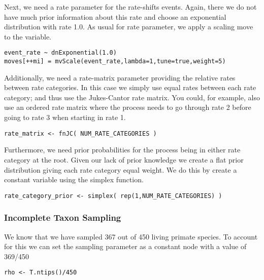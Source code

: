 Next, we need a rate parameter for the rate-shifts events.
Again, there we do not have much prior information about this rate and choose an exponential distribution with rate 1.0.
As usual for rate parameter, we apply a scaling move to the  variable.
{\tt \begin{snugshade*}
\begin{lstlisting}
event_rate ~ dnExponential(1.0)
moves[++mi] = mvScale(event_rate,lambda=1,tune=true,weight=5)
\end{lstlisting}
\end{snugshade*}}

Additionally, we need a rate-matrix parameter providing the relative rates between rate categories.
In this case we simply use equal rates between each rate category; and thus use the Jukes-Cantor rate matrix.
You could, for example, also use an ordered rate matrix where the process needs to go through rate 2 before going to rate 3 when starting in rate 1.
{\tt \begin{snugshade*}
\begin{lstlisting}
rate_matrix <- fnJC( NUM_RATE_CATEGORIES )
\end{lstlisting}
\end{snugshade*}}
Furthermore, we need prior probabilities for the process being in either rate category at the root.
Given our lack of prior knowledge we create a flat prior distribution giving each rate category equal weight.
We do this by create a constant variable using the simplex function.
{\tt \begin{snugshade*}
\begin{lstlisting}
rate_category_prior <- simplex( rep(1,NUM_RATE_CATEGORIES) )
\end{lstlisting}
\end{snugshade*}}



\subsubsection{Incomplete Taxon Sampling}

We know that we have sampled 367 out of 450 living primate species. 
To account for this we can set the sampling parameter as a constant node with a value of 369/450
{\tt \begin{snugshade*}
\begin{lstlisting}
rho <- T.ntips()/450
\end{lstlisting}
\end{snugshade*}}


